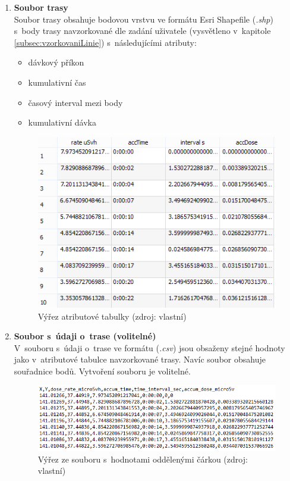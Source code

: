 \begin{enumerate}
	\item \textbf{Soubor trasy} \\ Soubor trasy obsahuje bodovou
vrstvu ve formátu Esri Shapefile (\textit{.shp}) s~body trasy
navzorkované dle zadání uživatele (vysvětleno v~kapitole
\ref{subsec:vzorkovaniLinie}) s~následujícími atributy:
		\begin{itemize}
			\item dávkový příkon
			\item kumulativní čas
			\item časový interval mezi body
			\item kumulativní dávka
		\end{itemize}
			\begin{figure}[H] \centering
      			\includegraphics[scale=1]{./pictures/atributova_tabulka.png}
      				\caption[Výřez atributové
tabulky]{Výřez atributové tabulky (zdroj: vlastní)}
     				\label{fig:atributova_tabulka}
  			\end{figure}
  	
  	\item \textbf{Soubor s~údaji o~trase (volitelné)} \\ V~souboru
s~údaji o~trase ve formátu  (\textit{.csv}) jsou obsaženy
stejné hodnoty jako v~atributové tabulce navzorkované trasy. Navíc
soubor obsahuje souřadnice bodů. Vytvoření souboru je volitelné.
  			\begin{figure}[H] \centering
      			\includegraphics[scale=0.8]{./pictures/csv.png}
      				\caption[Výřez ze souboru s~hodnotami
oddělenými čárkou]{Výřez ze souboru s~hodnotami oddělenými čárkou
(zdroj: vlastní)}
     				\label{fig:csv}
  			\end{figure}
\end{enumerate}

